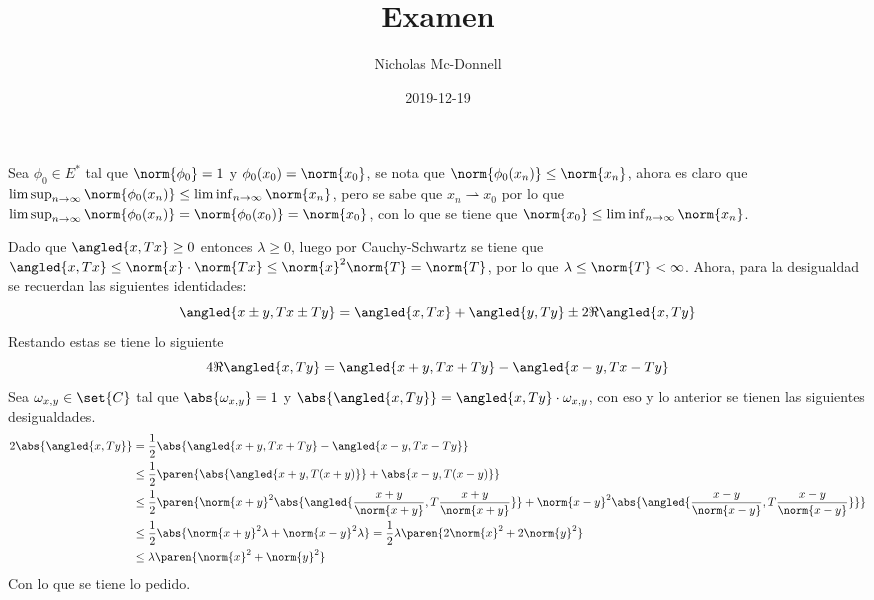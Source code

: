 \documentclass{homework}
\title{Examen}
\date{2019-12-19}
\author{Nicholas Mc-Donnell}
\begin{document}
\maketitle
\newpage
{}

\begin{sol}
    Sea \(\phi_0\in E^*\) tal que \(\norm{\phi_0}=1\) y \(\phi_0(x_0)=\norm{x_0}\), se nota que \(\norm{\phi_0(x_n)}\leq\norm{x_n}\), ahora es claro que \(\limsup_{n\rightarrow\infty}\norm{\phi_0(x_n)}\leq\liminf_{n\rightarrow\infty}\norm{x_n}\), pero se sabe que \(x_n\rightharpoonup x_0\) por lo que \(\limsup_{n\rightarrow\infty}\norm{\phi_0(x_n)}=\norm{\phi_0(x_0)}=\norm{x_0}\), con lo que se tiene que \(\norm{x_0}\leq\liminf_{n\rightarrow\infty}\norm{x_n}\).
\end{sol}

\begin{sol}
    Dado que \(\angled{x,Tx}\geq0\) entonces \(\lambda\geq0\), luego por Cauchy-Schwartz se tiene que \(\angled{x,Tx}\leq\norm{x}\cdot\norm{Tx}\leq\norm{x}^2\norm{T}=\norm{T}\), por lo que \(\lambda\leq\norm{T}<\infty \). Ahora, para la desigualdad se recuerdan las siguientes identidades:
    \begin{equation*}
        \angled{x\pm y,Tx\pm Ty}=\angled{x,Tx}+\angled{y,Ty}\pm2\Re\angled{x,Ty}
    \end{equation*}
    Restando estas se tiene lo siguiente
    \begin{equation*}
        4\Re\angled{x,Ty}=\angled{x+y,Tx+Ty}-\angled{x-y,Tx-Ty}
    \end{equation*}
    Sea \(\omega_{x,y}\in\set{C}\) tal que \(\abs{\omega_{x,y}}=1\) y \(\abs{\angled{x,Ty}}=\angled{x,Ty}\cdot\omega_{x,y}\), con eso y lo anterior se tienen las siguientes desigualdades.
    \begin{align*}
        2\abs{\angled{x,Ty}}&=\frac12\abs{\angled{x+y,Tx+Ty}-\angled{x-y,Tx-Ty}}\\
        &\leq\frac12\paren{\abs{\angled{x+y,T(x+y)}}+\abs{x-y,T(x-y)}}\\
        &\leq\frac12\paren{\norm{x+y}^2\abs{\angled{\frac{x+y}{\norm{x+y}},T\frac{x+y}{\norm{x+y}}}}+\norm{x-y}^2\abs{\angled{\frac{x-y}{\norm{x-y}},T\frac{x-y}{\norm{x-y}}}}}\\
        &\leq\frac12\abs{\norm{x+y}^2\lambda+\norm{x-y}^2\lambda}=\frac12\lambda\paren{2\norm{x}^2+2\norm{y}^2}\\
        &\leq\lambda\paren{\norm{x}^2+\norm{y}^2}
    \end{align*}
    Con lo que se tiene lo pedido.
\end{sol}
\end{document}
